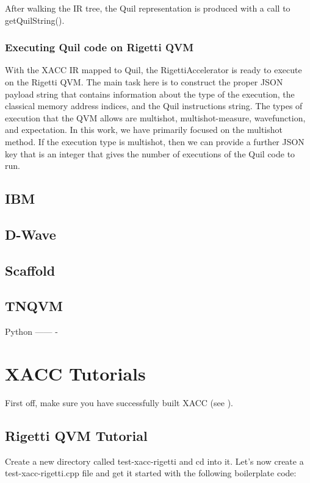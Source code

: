 \documentclass[letterpaper,10pt,english]{sphinxmanual}
\begin{document}
After walking the IR tree, the Quil representation is produced with a call to getQuilString().


\subsection{Executing Quil code on Rigetti QVM}
\label{\detokenize{plugins:executing-quil-code-on-rigetti-qvm}}
With the XACC IR mapped to Quil, the RigettiAccelerator is ready to execute
on the Rigetti QVM. The main task here is to construct the proper JSON payload string
that contains information about the type of the execution, the classical memory address
indices, and the Quil instructions string. The types of execution that the QVM allows are
multishot, multishot-measure, wavefunction, and expectation. In this work, we have primarily focused
on the multishot method. If the execution type is
multishot, then we can provide a further JSON key that is an integer that gives the
number of executions of the Quil code to run.


\section{IBM}
\label{\detokenize{plugins:ibm}}

\section{D-Wave}
\label{\detokenize{plugins:d-wave}}

\section{Scaffold}
\label{\detokenize{plugins:scaffold}}

\section{TNQVM}
\label{\detokenize{plugins:tnqvm}}
Python
—— -


\chapter{XACC Tutorials}
\label{\detokenize{tutorials:xacc-tutorials}}\label{\detokenize{tutorials::doc}}
First off, make sure you have successfully built XACC (see ).


\section{Rigetti QVM Tutorial}
\label{\detokenize{tutorials:rigetti-qvm-tutorial}}
Create a new directory called test-xacc-rigetti and cd into it. Let’s now create a
test-xacc-rigetti.cpp file and get it started with the following boilerplate code:
\end{document}
